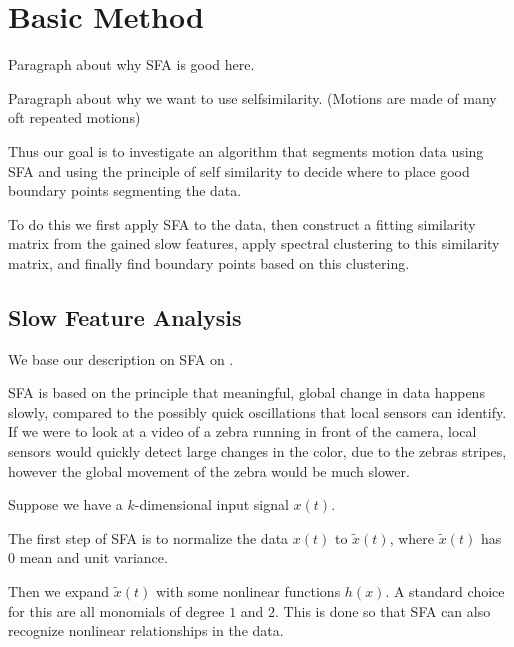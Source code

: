 \section{Basic Method}


Paragraph about why SFA is good here.

Paragraph about why we want to use selfsimilarity. (Motions are made of many oft repeated motions)

Thus our goal is to investigate an algorithm that segments motion data using SFA and using the principle of self similarity to decide where to place good boundary points segmenting the data.

To do this we first apply SFA to the data, then construct a fitting similarity matrix from the gained slow features, apply spectral clustering to this similarity matrix, and finally find boundary points based on this clustering.
\subsection{Slow Feature Analysis}
We base our description on SFA on .

SFA is based on the principle that meaningful, global change in data happens slowly, compared to the possibly quick oscillations that local sensors can identify. If we were to look at a video of a zebra running in front of the camera, local sensors would quickly detect large changes in the color, due to the zebras stripes, however the global movement of the zebra would be much slower.


Suppose we have a $k$-dimensional input signal $x(t)$.

The first step of SFA is to normalize the data $x(t)$ to $\tilde{x}(t)$, where $\tilde{x}(t)$ has $0$ mean and unit variance.

Then we expand $\tilde{x}(t)$ with some nonlinear functions $h(x)$. A standard choice for this are all monomials of degree $1$ and $2$. This is done so that SFA can also recognize nonlinear relationships in the data.

